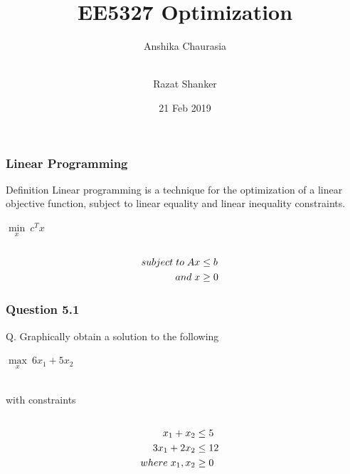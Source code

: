 \documentclass{beamer}
\title[Linear Programming] %
{EE5327 Optimization}
\author[Anshika,Razat] %
{Anshika Chaurasia \and \\Razat Shanker}
\institute[VFU] %
{
  
  EE18MTECH11017\\
  EE18MTECH11016
 
 }
\date[VLC 2013] %
{21 Feb 2019}
\begin{document}
 
\frame{\titlepage}

 
\begin{frame}
\frametitle{Linear Programming}

\begin{block}{Definition}
 Linear programming is a technique for the optimization of a linear objective function, subject to linear equality and linear inequality constraints.
\end{block}
\begin{center}

 $\min\limits_{x}\ c^Tx$
\begin{alignat*}{2}
  \\subject\hspace{0.1cm} to\hspace{0.1cm}  Ax &\le b
\\and\hspace{0.1cm} x &\ge 0   
\end{alignat*}

\end{center}




\end{frame}
 
 \begin{frame}
 \frametitle{Question 5.1}
 
Q. Graphically obtain a solution to the following
\begin{center}
   $\max\limits_{x}\ 6x_{1} + 5x_{2}$ 
\end{center}
 
 \\ with constraints
\begin{alignat*}{1}
 \\ x_{1} + x_{2} &\le 5
 \\ 3x_{1} + 2x_{2} &\le 12
 \\where \hspace{0.1cm} x_{1},x_{2} &\ge 0
 \end{alignat*}

\end{frame}
 
\end{document}
